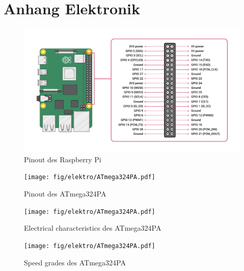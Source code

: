 \renewcommand\appendixname{Anhang}
\renewcommand\appendixpagename{Anhang}
\renewcommand\appendixtocname{Anhang}

\lohead{}

\appendix
\begingroup
\makeatletter
\let\ps@plain\ps@empty
\appendixpage
\makeatother
\endgroup

\chapter{Anhang Elektronik}

\begin{figure}[htb]
    \centering
    \includegraphics[scale=0.25]{fig/elektro/GPIO-Pinout-Diagram.png}
    \caption{Pinout des Raspberry Pi}
\end{figure}

\begin{figure}[hb]
    \centering
    \texttt{[image: fig/elektro/ATmega324PA.pdf]}
    \caption{Pinout des ATmega324PA}
\end{figure}

\begin{figure}[hb]
    \centering
    \texttt{[image: fig/elektro/ATmega324PA.pdf]}
    \caption{Electrical characteristics des ATmega324PA}
\end{figure}

\begin{figure}[hb]
    \centering
    \texttt{[image: fig/elektro/ATmega324PA.pdf]}
    \caption{Speed grades des ATmega324PA}
\end{figure}

